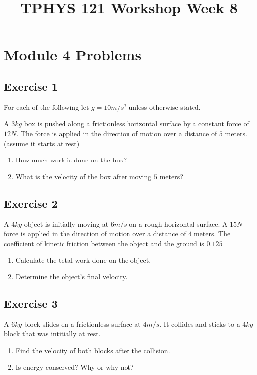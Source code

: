 \documentclass[11pt]{article}
\title{TPHYS 121 Workshop Week 8}
\author{}
\date{\vspace{-15ex}}
\newenvironment{exercise}{
    \begin{mdframed}[style=problemstyle]\textcolor{black}{}
}{
    \end{mdframed}
}
\begin{document}
\maketitle

\section*{Module 4 Problems}
\subsection*{Exercise 1}
For each of the following let $g=10m/s^2$ unless otherwise stated.
\begin{exercise}
    A $3kg$ box is pushed along a frictionless horizontal surface by a 
    constant force of $12N$. The force is applied in the direction of 
    motion over a distance of $5$ meters.(assume it starts at rest)
    \begin{enumerate}[label=\alph*]
        \item How much work is done on the box? 
        \item What is the velocity of the box after moving $5$ meters?
    \end{enumerate}
\end{exercise}

\subsection*{Exercise 2}
\begin{exercise}
    A $4kg$ object is initially moving at $6m/s$ on a rough horizontal 
    surface. A $15N$ force is applied in the direction of motion over a 
    distance of $4$ meters. The coefficient of kinetic friction between the
    object and the ground is $0.125$
    \begin{enumerate}[label=\alph*]
        \item Calculate the total work done on the object. 
        \item Determine the object's final velocity.
    \end{enumerate}
\end{exercise}

\subsection*{Exercise 3}
\begin{exercise}
    A $6kg$ block slides on a frictionless surface at $4m/s$. It collides
    and sticks to a $4kg$ block that was intitially at rest.
    \begin{enumerate}
        \item Find the velocity of both blocks after the collision. 
        \item Is energy conserved? Why or why not?
    \end{enumerate}
\end{exercise}
\end{document}
